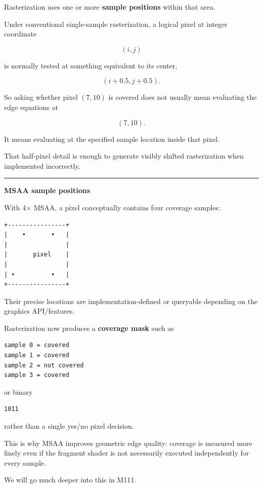 Rasterization uses one or more \textbf{sample positions} within that area.

Under conventional single-sample rasterization, a logical pixel at integer coordinate

\[
(i,j)
\]

is normally tested at something equivalent to its center,

\[
(i+0.5,j+0.5).
\]

So asking whether pixel \((7,10)\) is covered does not usually mean evaluating the edge equations at

\[
(7,10).
\]

It means evaluating at the specified sample location inside that pixel.

That half-pixel detail is enough to generate visibly shifted rasterization when implemented incorrectly.

\begin{center}\rule{0.5\linewidth}{0.5pt}\end{center}

\textbf{MSAA sample positions}

With 4× MSAA, a pixel conceptually contains four coverage samples:

\begin{verbatim}
+----------------+
|    •       •   |
|                |
|       pixel    |
|                |
| •          •   |
+----------------+
\end{verbatim}

Their precise locations are implementation-defined or queryable depending on the graphics API/features.

Rasterization now produces a \textbf{coverage mask} such as

\begin{verbatim}
sample 0 = covered
sample 1 = covered
sample 2 = not covered
sample 3 = covered
\end{verbatim}

or binary

\begin{verbatim}
1011
\end{verbatim}

rather than a single yes/no pixel decision.

This is why MSAA improves geometric edge quality: coverage is measured more finely even if the fragment shader is not necessarily executed independently for every sample.

We will go much deeper into this in M111.

